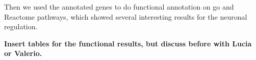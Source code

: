 Then we used the annotated genes to do functional annotation on \gls{go} \cite{GeneOntologyConsortium2004, GeneOntologyConsortium2015} and Reactome pathways, which showed several interesting results for the neuronal regulation.

\textbf{Insert tables for the functional results, but discuss before with Lucia or Valerio.}







